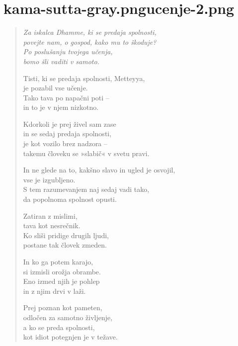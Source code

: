 
\chapter[Tissametteyya Sutta]{{kama-sutta-gray.png}{ucenje-2.png}}


\begin{verse}


\emph{Za iskalca Dhamme, ki se predaja spolnosti,\\
povejte nam, o gospod, kako mu to škoduje?\\
Po poslušanju tvojega učenja,\\
bomo šli vaditi v samoto.}

Tisti, ki se predaja spolnosti, Metteyya,\\
je pozabil vse učenje.\\
Tako tava po napačni poti --\\
in to je v njem nizkotno.

Kdorkoli je prej živel sam zase\\
in se sedaj predaja spolnosti,\\
je kot vozilo brez nadzora --\\
takemu človeku se »slabič« v svetu pravi.

In ne glede na to, kakšno slavo in ugled je osvojil,\\
vse je izgubljeno.\\
S tem razumevanjem naj sedaj vadi tako,\\
da popolnoma spolnost opusti.

Zatiran z mislimi,\\
tava kot nesrečnik.\\
Ko sliši pridige drugih ljudi,\\
postane tak človek zmeden.

In ko ga potem karajo,\\
si izmisli orožja obrambe.\\
Eno izmed njih je pohlep\\
in z njim drvi v laži.

Prej poznan kot pameten,\\
odločen za samotno življenje,\\
a ko se preda spolnosti,\\
kot idiot potegnjen je v težave.


\end{verse}
